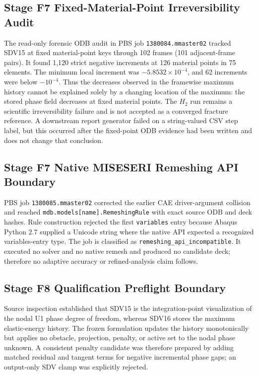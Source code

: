 \subsection{Stage F7 Fixed-Material-Point Irreversibility Audit}
The read-only forensic ODB audit in PBS job
\texttt{1380084.mmaster02} tracked SDV15 at fixed material-point keys through
102 frames (101 adjacent-frame pairs). It found 1,120 strict negative
increments at 126 material points in 75 elements. The minimum local increment
was $-5.8532\times10^{-4}$, and 62 increments were below
$-10^{-4}$. Thus the decreases observed in the framewise maximum history
cannot be explained solely by a changing location of the maximum: the stored
phase field decreases at fixed material points. The $H_2$ run remains a
scientific irreversibility failure and is not accepted as a converged
fracture reference. A downstream report generator failed on a string-valued
CSV step label, but this occurred after the fixed-point ODB evidence had been
written and does not change that conclusion.

\subsection{Stage F7 Native MISESERI Remeshing API Boundary}
PBS job \texttt{1380085.mmaster02} corrected the earlier CAE driver-argument
collision and reached \texttt{mdb.models[name].RemeshingRule} with exact
source ODB and deck hashes. Rule construction rejected the first
\texttt{variables} entry because Abaqus Python 2.7 supplied a Unicode string
where the native API expected a recognized variables-entry type. The job is
classified as \texttt{remeshing\_api\_incompatible}. It executed no solver
and no native remesh and produced no candidate deck; therefore no adaptive
accuracy or refined-analysis claim follows.

\subsection{Stage F8 Qualification Preflight Boundary}
Source inspection established that SDV15 is the integration-point
visualization of the nodal U1 phase degree of freedom, whereas SDV16 stores
the maximum elastic-energy history. The frozen formulation updates the
history monotonically but applies no obstacle, projection, penalty, or active
set to the nodal phase unknown. A consistent penalty candidate was therefore
prepared by adding matched residual and tangent terms for negative
incremental phase gaps; an output-only SDV clamp was explicitly rejected.

